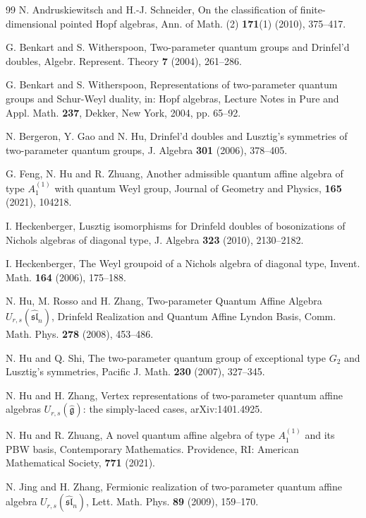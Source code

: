 \documentclass[12pt]{amsart}
\numberwithin{equation}{section}
\numberwithin{equation}{section}
\begin{document}
\begin{thebibliography}{99}
N. Andruskiewitsch and H.-J. Schneider, On the classification of finite-dimensional pointed Hopf algebras, Ann. of Math. (2) \textbf{171}(1) (2010), 375--417.

G. Benkart and S. Witherspoon, Two-parameter quantum groups and Drinfel'd doubles, Algebr. Represent. Theory \textbf{7} (2004), 261--286.

G. Benkart and S. Witherspoon, Representations of two-parameter quantum groups and Schur-Weyl duality, in: Hopf algebras, Lecture Notes in Pure and Appl. Math. \textbf{237}, Dekker, New York, 2004, pp. 65--92.

N. Bergeron, Y. Gao and N. Hu, Drinfel'd doubles and Lusztig's symmetries of two-parameter quantum groups, J. Algebra \textbf{301} (2006), 378--405.

G. Feng, N. Hu and R. Zhuang, Another admissible quantum affine algebra of type \(A^{(1)}_1\) with quantum Weyl group, Journal of Geometry and Physics, \textbf{165} (2021), 104218.

I. Heckenberger, Lusztig isomorphisms for Drinfeld doubles of bosonizations of Nichols algebras of diagonal type, J. Algebra \textbf{323} (2010), 2130--2182.

I. Heckenberger, The Weyl groupoid of a Nichols algebra of diagonal type, Invent. Math. \textbf{164} (2006), 175--188.

N. Hu, M. Rosso and H. Zhang, Two-parameter Quantum Affine Algebra $U_{r,s}(\widehat{\mathfrak{sl}}_n)$, Drinfeld Realization and Quantum Affine Lyndon Basis, Comm. Math. Phys. \textbf{278} (2008), 453--486.

N. Hu and Q. Shi, The two-parameter quantum group of exceptional type $G_2$ and Lusztig's symmetries, Pacific J. Math. \textbf{230} (2007), 327--345.

N. Hu and H. Zhang, Vertex representations of two-parameter quantum affine algebras $U_{r,s}(\widehat{\mathfrak{g}})$: the simply-laced cases, arXiv:1401.4925.

N. Hu and R. Zhuang, A novel quantum affine algebra of type \(A^{(1)}_1\) and its PBW basis, Contemporary Mathematics. Providence, RI: American Mathematical Society, \textbf{771} (2021).

N. Jing and H. Zhang, Fermionic realization of two-parameter quantum affine algebra $U_{r,s}(\widehat{\mathfrak{sl}}_n)$, Lett. Math. Phys. \textbf{89} (2009), 159--170.


\end{thebibliography}
\end{document}

